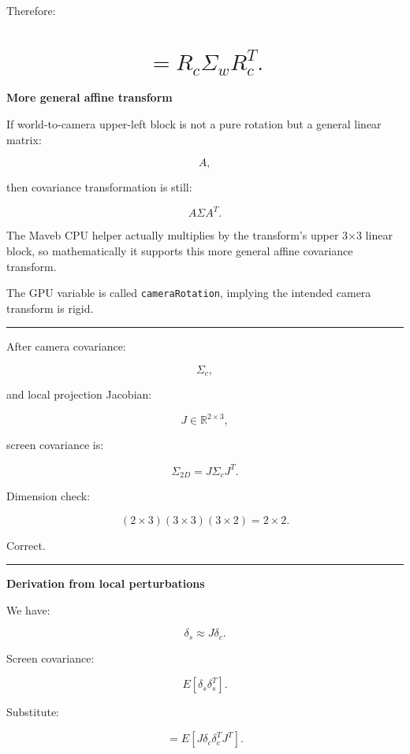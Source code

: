 Therefore:

\section{\texorpdfstring{\[
=
R_c\Sigma_wR_c^T.
\]}{
=
R\_c\textbackslash Sigma\_wR\_c\^{}T.
}}\label{04-visual-computing-ii-ch038-r_csigma_wr_ct.}

\textbf{More general affine transform}

If world-to-camera upper-left block is not a pure rotation but a general linear matrix:

\[
A,
\]

then covariance transformation is still:

\[
\boxed{
A\Sigma A^T.
}
\]

The Maveb CPU helper actually multiplies by the transform's upper 3×3 linear block, so mathematically it supports this more general affine covariance transform.

The GPU variable is called \texttt{cameraRotation}, implying the intended camera transform is rigid.

\begin{center}\rule{0.5\linewidth}{0.5pt}\end{center}

After camera covariance:

\[
\Sigma_c,
\]

and local projection Jacobian:

\[
J\in\mathbb R^{2\times3},
\]

screen covariance is:

\[
\boxed{
\Sigma_{2D}
=
J
\Sigma_c
J^T.
}
\]

Dimension check:

\[
(2\times3)
(3\times3)
(3\times2)
=
2\times2.
\]

Correct.

\begin{center}\rule{0.5\linewidth}{0.5pt}\end{center}

\textbf{Derivation from local perturbations}

We have:

\[
\delta_s
\approx
J\delta_c.
\]

Screen covariance:

\[
E[
\delta_s
\delta_s^T
].
\]

Substitute:

\[
=
E[
J\delta_c
\delta_c^T
J^T
].
\]

